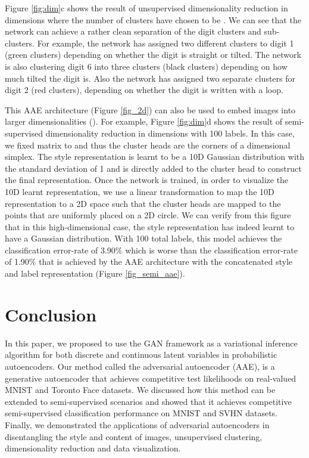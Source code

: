 \documentclass{article}
\begin{document}
Figure \ref{fig:dim}c shows the result of unsupervised dimensionality reduction in  dimensions where the number of clusters have chosen to be . We can see that the network can achieve a rather clean separation of the digit clusters and sub-clusters. For example, the network has assigned two different clusters to digit 1 (green clusters) depending on whether the digit is straight or tilted. The network is also clustering digit 6 into three clusters (black clusters) depending on how much tilted the digit is. Also the network has assigned two separate clusters for digit 2 (red clusters), depending on whether the digit is written with a loop.

This AAE architecture (Figure \ref{fig_2d}) can also be used to embed images into larger dimensionalities (). For example, Figure \ref{fig:dim}d shows the result of semi-supervised dimensionality reduction in  dimensions with 100 labels. In this case, we fixed  matrix to  and thus the cluster heads are the corners of a  dimensional simplex. The style representation is learnt to be a 10D Gaussian distribution with the standard deviation of 1 and is directly added to the cluster head to construct the final representation. Once the network is trained, in order to visualize the 10D learnt representation, we use a linear transformation to map the 10D representation to a 2D space such that the cluster heads are mapped to the points that are uniformly placed on a 2D circle. We can verify from this figure that in this high-dimensional case, the style representation has indeed learnt to have a Gaussian distribution. With 100 total labels, this model achieves the classification error-rate of 3.90\% which is worse than the classification error-rate of 1.90\% that is achieved by the AAE architecture with the concatenated style and label representation (Figure \ref{fig_semi_aae}).

\section{Conclusion}

In this paper, we proposed to use the GAN framework as a variational inference algorithm for both discrete and continuous latent variables in probabilistic autoencoders. Our method called the adversarial autoencoder (AAE), is a generative autoencoder that achieves competitive test likelihoods on real-valued MNIST and Toronto Face datasets. We discussed how this method can be extended to semi-supervised scenarios and showed that it achieves competitive semi-supervised classification performance on MNIST and SVHN datasets. Finally, we demonstrated the applications of adversarial autoencoders in disentangling the style and content of images, unsupervised clustering, dimensionality reduction and data visualization.
\end{document}
